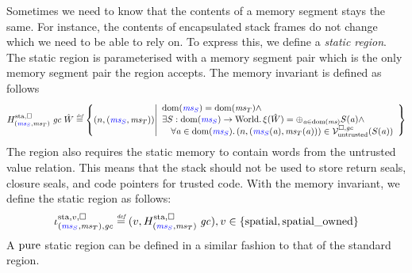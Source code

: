 \begin{jversion}
Sometimes we need to know that the contents of a memory segment stays the same.
For instance, the contents of encapsulated stack frames do not change which we need to be able to rely on.
To express this, we define a \emph{static region}.
The static region is parameterised with a memory segment pair which is the only memory segment pair the region accepts.
The memory invariant is defined as follows
\[
  H^\mathrm{sta,\square}_{\stpair{\ms}{\ms}} \; \gc \; \hat{W} \defeq \left\{ \npair{\stpair{\ms}{\ms}} \middle| 
    \begin{array}{l}
      \dom(\src{\ms_S}) = \dom(\ms_T) \wedge \\
      \exists S : \dom(\src{\ms_S}) \fun \World \ldotp \xi(\hat{W}) = \oplus_{\aaddr \in \dom(\ms)} S(\aaddr) \wedge\\
      \quad \forall \aaddr \in \dom(\src{\ms_S}) \ldotp \npair{(\src{\ms_S}(\aaddr),\ms_T(\aaddr))} \in \lrv(S(\aaddr))
    \end{array}
\right\}
\]
The region also requires the static memory to contain words from the untrusted value relation.
This means that the stack should not be used to store return seals, closure seals, and code pointers for trusted code.
With the memory invariant, we define the static region as follows:
\[
  \stareg[\stpair{\ms}{\ms},\gc]{v,\square} \defeq (v,H^\mathrm{sta,\square}_{\stpair{\ms}{\ms}} \; \gc) , v \in \{\spatial,\spatialo\}
\]
A $\mathrm{pure}$ static region can be defined in a similar fashion to that of the standard region.


\end{jversion}
